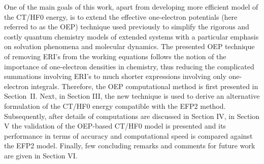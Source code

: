 One of the main goals of this work, apart from developing
more efficient model of the CT/HF0 energy, is to
extend the effective one\hyp{}electron potentials (here referred to as the OEP) 
technique
used previously\cite{
Otto.Ladik.ChemPhys.1975,
Holas.March.PhysRevA.1991,
Weber.Thiel.TCA.2000,
Neese.JCP.2005,
Cisneros.Andres.Piquemal.Darden.JCP.2005,
Piquemal.Cisneros.Reinhardt.Gresh.Darden.JCP.2006,
Li.Gordon.Jensen.JCP.2006,
Blasiak.Lee.Cho.JCP.2013,
Blasiak.Maj.Cho.Gora.JCTC.2015}
to simplify the rigorous and costly quantum chemistry models of extended systems
with a particular emphasis on solvation phenomena and molecular dynamics.
The presented OEP technique of removing ERI's from the working
equations
follows the notion of the importance of 
one\hyp{}electron densities in chemistry\cite{Holas.March.PhysRevA.1991},
thus reducing the complicated summations involving ERI's to much shorter expressions involving
only one\hyp{}electron integrals.
Therefore, the OEP computational method is first presented in Section~II.
Next, in Section III,
the new technique is used to derive an alternative formulation of the CT/HF0 energy
compatible with the EFP2 method. Subsequently, after details of computations
are discussed in Section IV, in Section V the validation of the 
OEP\hyp{}based CT/HF0 model is presented and its performance in terms 
of accuracy and computational speed is compared against the EFP2
model. Finally, few concluding remarks and comments for future work
are given in Section VI.
%

